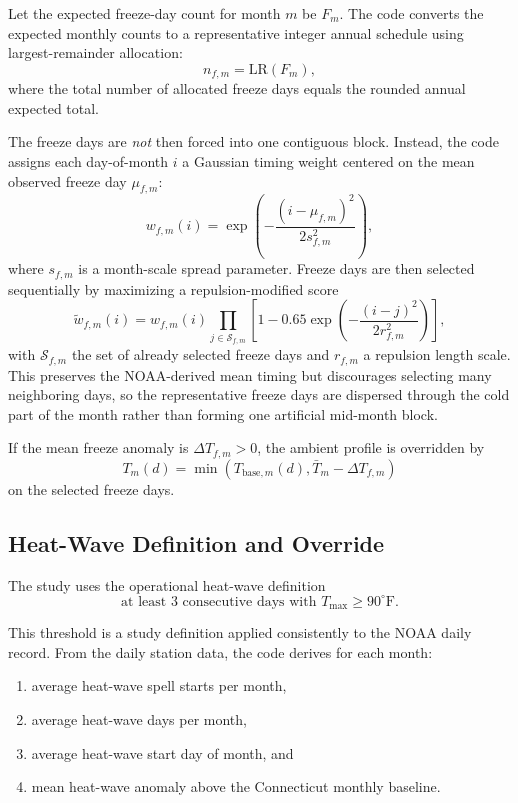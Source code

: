 \documentclass{article}
\begin{document}
Let the expected freeze-day count for month $m$ be $F_m$. The code converts
the expected monthly counts to a representative integer annual schedule using
largest-remainder allocation:
\begin{equation}
n_{f,m} = \mathrm{LR}(F_m),
\end{equation}
where the total number of allocated freeze days equals the rounded annual
expected total.

The freeze days are \emph{not} then forced into one contiguous block. Instead,
the code assigns each day-of-month $i$ a Gaussian timing weight centered on
the mean observed freeze day $\mu_{f,m}$:
\begin{equation}
w_{f,m}(i)
=
\exp\!\left(
-\frac{(i-\mu_{f,m})^2}{2s_{f,m}^2}
\right),
\end{equation}
where $s_{f,m}$ is a month-scale spread parameter. Freeze days are then
selected sequentially by maximizing a repulsion-modified score
\begin{equation}
\tilde{w}_{f,m}(i)
=
w_{f,m}(i)
\prod_{j\in\mathcal{S}_{f,m}}
\left[
1-0.65\exp\!\left(
-\frac{(i-j)^2}{2r_{f,m}^2}
\right)
\right],
\end{equation}
with $\mathcal{S}_{f,m}$ the set of already selected freeze days and
$r_{f,m}$ a repulsion length scale. This preserves the NOAA-derived mean timing
but discourages selecting many neighboring days, so the representative freeze
days are dispersed through the cold part of the month rather than forming one
artificial mid-month block.

If the mean freeze anomaly is $\Delta T_{f,m}>0$, the ambient profile is
overridden by
\begin{equation}
T_m(d)
=
\min\!\left(
T_{\mathrm{base},m}(d),
\bar{T}_m - \Delta T_{f,m}
\right)
\end{equation}
on the selected freeze days.

\subsection{Heat-Wave Definition and Override}

The study uses the operational heat-wave definition
\begin{equation}
\text{at least 3 consecutive days with } T_{\max} \ge 90^\circ\mathrm{F}.
\end{equation}

This threshold is a study definition applied consistently to the NOAA daily
record. From the daily station data, the code derives for each month:
\begin{enumerate}
\item average heat-wave spell starts per month,
\item average heat-wave days per month,
\item average heat-wave start day of month, and
\item mean heat-wave anomaly above the Connecticut monthly baseline.
\end{enumerate}
\end{document}
